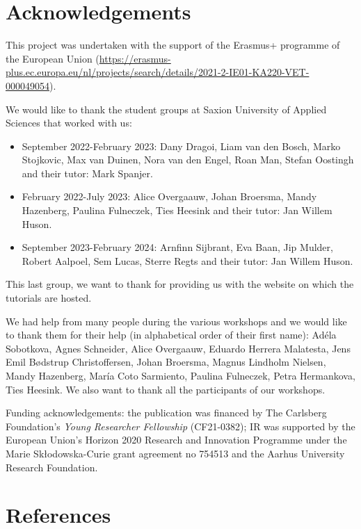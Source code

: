 \documentclass[
]{article}
\begin{document}
\hypertarget{acknowledgements}{%
\section{Acknowledgements}\label{acknowledgements}}

This project was undertaken with the support of the Erasmus+ programme of the European Union (\url{https://erasmus-plus.ec.europa.eu/nl/projects/search/details/2021-2-IE01-KA220-VET-000049054}).

We would like to thank the student groups at Saxion University of Applied Sciences that worked with us:

\begin{itemize}
\item
  September 2022-February 2023: Dany Dragoi, Liam van den Bosch, Marko Stojkovic, Max van Duinen, Nora van den Engel, Roan Man, Stefan Oostingh and their tutor: Mark Spanjer.
\item
  February 2022-July 2023: Alice Overgaauw, Johan Broersma, Mandy Hazenberg, Paulina Fulneczek, Ties Heesink and their tutor: Jan Willem Huson.
\item
  September 2023-February 2024: Arnfinn Sijbrant, Eva Baan, Jip Mulder, Robert Aalpoel, Sem Lucas, Sterre Regts and their tutor: Jan Willem Huson.
\end{itemize}

This last group, we want to thank for providing us with the website on which the tutorials are hosted.

We had help from many people during the various workshops and we would like to thank them for their help (in alphabetical order of their first name): Adéla Sobotkova, Agnes Schneider, Alice Overgaauw, Eduardo Herrera Malatesta, Jens Emil Bødstrup Christoffersen, Johan Broersma, Magnus Lindholm Nielsen, Mandy Hazenberg, María Coto Sarmiento, Paulina Fulneczek, Petra Hermankova, Ties Heesink. We also want to thank all the participants of our workshops.

Funding acknowledgements: the publication was financed by The Carlsberg Foundation's \emph{Young Researcher Fellowship} (CF21-0382); IR was supported by the European Union's Horizon 2020 Research and Innovation Programme under the Marie Skłodowska-Curie grant agreement no 754513 and the Aarhus University Research Foundation.

\hypertarget{references}{%
\section*{References}\label{references}}
\end{document}
